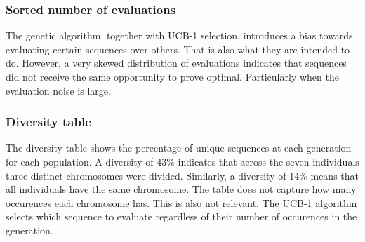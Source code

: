 \subsubsection{Sorted number of evaluations}
The genetic algorithm, together with UCB-1 selection, introduces a bias towards
evaluating certain sequences over others. That is also what they are intended
to do. However, a very skewed distribution of evaluations indicates that
sequences did not receive the same opportunity to prove optimal. Particularly
when the evaluation noise is large.
\subsubsection{Diversity table}
The diversity table shows the percentage of unique sequences at
each generation for each population. A diversity of 43\% indicates that across
the seven individuals three distinct chromosomes were divided. Similarly, a
diversity of 14\% means that all individuals have the same chromosome. The
table does not capture how many occurences each chromosome has. This is also
not relevant. The UCB-1 algorithm selects which sequence to evaluate regardless
of their number of occurences in the generation.
